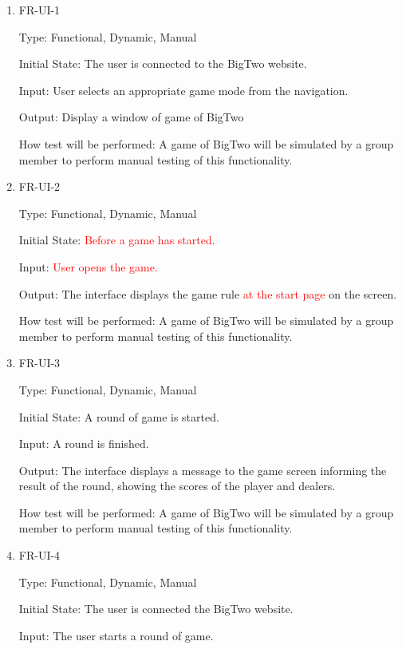 \documentclass[12pt, titlepage]{article}
\begin{document}
\begin{enumerate}

\item{FR-UI-1\\}

Type: Functional, Dynamic, Manual
					
Initial State: The user is connected to the BigTwo website.
					
Input: User selects an appropriate game mode from the navigation.
					
Output: Display a window of game of BigTwo
					
How test will be performed: A game of BigTwo will be simulated by a group member to perform manual testing of this functionality.
					
\item{FR-UI-2\\}

Type: Functional, Dynamic, Manual
					
Initial State: \textcolor{red}{Before a game has started.}
					
Input: \textcolor{red}{User opens the game.}
					
Output: The interface displays the game rule \textcolor{red}{at the start page} on the screen.
					
How test will be performed: A game of BigTwo will be simulated by a group member to perform manual testing of this functionality.

\item{FR-UI-3\\}

Type: Functional, Dynamic, Manual
					
Initial State: A round of game is started.
					
Input: A round is finished.
					
Output: The interface displays a message to the game screen informing the result of the round, showing the scores of the player and dealers.
					
How test will be performed: A game of BigTwo will be simulated by a group member to perform manual testing of this functionality.

\item{FR-UI-4\\}

Type: Functional, Dynamic, Manual
					
Initial State: The user is connected the BigTwo website.
					
Input: The user starts a round of game.
					

\end{enumerate}
\end{document}
